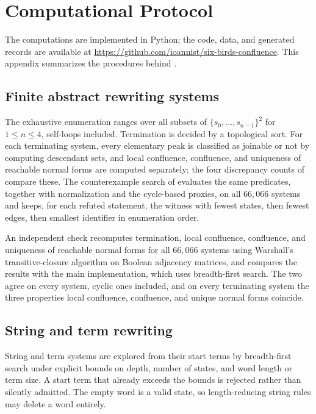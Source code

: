 \section{Computational Protocol}
\label{app:computational-protocol}

The computations are implemented in Python; the code, data, and generated records are available at \url{https://github.com/ioannist/six-birds-confluence}. This appendix summarizes the procedures behind .

\subsection{Finite abstract rewriting systems}

The exhaustive enumeration ranges over all subsets of $\{s_0,\dots,s_{n-1}\}^2$ for $1 \le n \le 4$, self-loops included. Termination is decided by a topological sort. For each terminating system, every elementary peak is classified as joinable or not by computing descendant sets, and local confluence, confluence, and uniqueness of reachable normal forms are computed separately; the four discrepancy counts of  compare these. The counterexample search of  evaluates the same predicates, together with normalization and the cycle-based proxies, on all $66{,}066$ systems and keeps, for each refuted statement, the witness with fewest states, then fewest edges, then smallest identifier in enumeration order.

An independent check recomputes termination, local confluence, confluence, and uniqueness of reachable normal forms for all $66{,}066$ systems using Warshall's transitive-closure algorithm on Boolean adjacency matrices, and compares the results with the main implementation, which uses breadth-first search. The two agree on every system, cyclic ones included, and on every terminating system the three properties local confluence, confluence, and unique normal forms coincide.

\subsection{String and term rewriting}

String and term systems are explored from their start terms by breadth-first search under explicit bounds on depth, number of states, and word length or term size. A start term that already exceeds the bounds is rejected rather than silently admitted. The empty word is a valid state, so length-reducing string rules may delete a word entirely.

